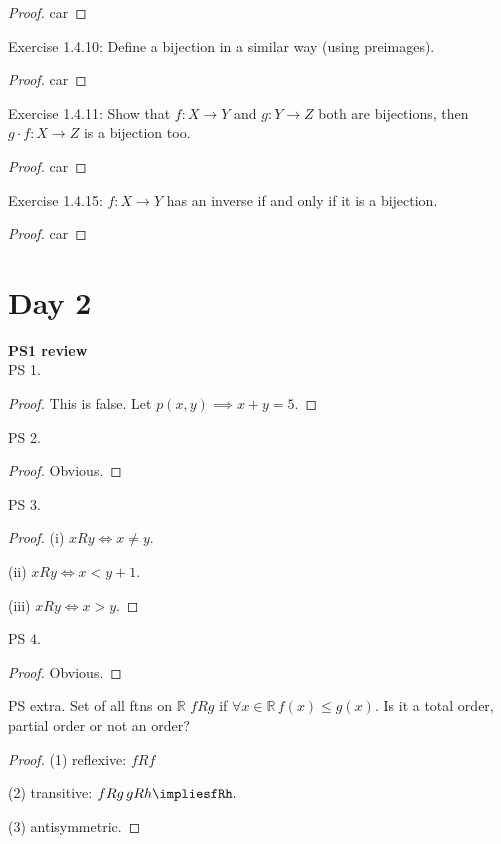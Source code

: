\documentclass[a4paper]{article}
\newcommand{\R}{\mathbb{R}}
\begin{document}
\begin{proof}
	car
\end{proof}

\noindent Exercise 1.4.10: Define a bijection in a similar way (using preimages). 

\begin{proof}
	car
\end{proof}

\noindent Exercise 1.4.11: Show that $f: X \to Y$ and $g: Y \to Z$ both are bijections, then $g \cdot f: X \to Z$ is a bijection too.

\begin{proof}
	car
\end{proof}

\noindent Exercise 1.4.15: $f: X \to Y$  has an inverse if and only if it is a bijection.

\begin{proof}
	car
\end{proof}


\section{Day 2}

\textbf{PS1 review}\\

PS 1.
\begin{proof}
	This is false. Let $p(x,y) \implies x+y=5$.
\end{proof}

PS 2.
\begin{proof}
	Obvious.
\end{proof}

PS 3.
\begin{proof}
	(i) $xRy \iff x \neq y.$

	(ii) $xRy \iff x < y+1.$

	(iii) $xRy \iff x>y.$
\end{proof}

PS 4.
\begin{proof}
	Obvious.
\end{proof}

PS extra. Set of all ftns on $\R$ $fRg$ if $\forall x \in \R \, f(x) \le g(x).$ Is it a total order, partial order or not an order?
\begin{proof}
	(1) reflexive: $fRf$ 

	(2) transitive: $fRg \, gRh \impliesfRh.$

	(3) antisymmetric.
\end{proof}
\end{document}
